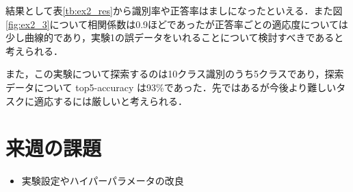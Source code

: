 \documentclass[twocolumn]{jarticle}     %
\begin{document}
\begin{table}[h]
	\centering
	\caption{実験2の結果\label{tb:ex2_res}}
\end{table}

結果として表\ref{tb:ex2_res}から識別率や正答率はましになったといえる．また図\ref{fig:ex2_3}について相関係数は0.9ほどであったが正答率ごとの適応度については少し曲線的であり，実験1の誤データをいれることについて検討すべきであると考えられる．

また，この実験について探索するのは10クラス識別のうち5クラスであり，探索データについて top5-accuracy は93\%であった．先ではあるが今後より難しいタスクに適応するには厳しいと考えられる．

\section{来週の課題}
\begin{itemize}
	\item 実験設定やハイパーパラメータの改良
\end{itemize}
\end{document}

